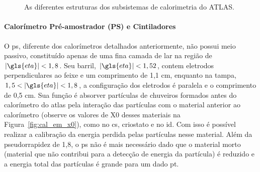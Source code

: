 \begin{figure}[ht!]
\begin{center}
{        } \\
        \hspace{0.01\textwidth}
         \\
%
    \end{center}
    \caption[As diferentes estruturas dos subsistemas de calorimetria do ATLAS]{%
As diferentes estruturas dos subsistemas de calorimetria do ATLAS.
     }%
\end{figure}


\paragraph{Calorímetro Pré-amostrador (PS) e Cintiladores}
\label{par:cal_ps}

O \gls{ps}, diferente dos calorímetros detalhados anteriormente, não possui meio passivo, 
constituído apenas de uma fina camada de \gls{lar} na região de
$|\gls{eta}|<1,8$. Seu barril, $|\gls{eta}|<1,52$, contem eletrodos
perpendiculares ao feixe e um comprimento de 1,1 cm, enquanto na tampa,
$1,5<|\gls{eta}|<1,8$, a configuração dos eletrodos é paralela e o comprimento
de 0,5 cm. Sua função é absorver partículas de chuveiros formados antes do
calorímetro do \gls{atlas} pela interação das partículas com o material anterior
ao calorímetro (observe os valores de \gls{X0} desses materiais na Figura~\ref{fig:cal_em_x0}), 
como no \gls{cs}, criostato e no \gls{id}. Com isso é possível realizar 
a calibração da energia perdida pelas partículas nesse material.
Além da pseudorrapidez de 1,8, o \gls{ps} não é mais 
necessário dado que o material morto (material que não contribui para a detecção
de energia da partícula) é reduzido e a energia total das partículas 
é grande para um dado \gls{pt}.

